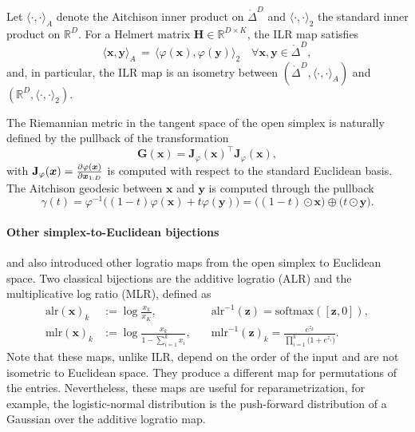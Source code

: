 \begin{theorem}\label{thm:isometry}
Let $\langle\cdot,\cdot\rangle_A$ denote the Aitchison inner product on $\mathring \Delta^{D}$ and $\langle\cdot,\cdot\rangle_2$ the standard inner product on $\mathbb{R}^{D}$. For a Helmert matrix $\mathbf{H} \in\mathbb{R}^{D\times K}$, the ILR map satisfies
\begin{equation*}
    \langle \boldsymbol{x}, \boldsymbol{y} \rangle_A \,=\, \langle \varphi(\boldsymbol{x}), \varphi(\boldsymbol{y}) \rangle_2 \quad \forall \boldsymbol{x},\boldsymbol{y}\in \mathring\Delta^D,
\end{equation*}
and, in particular, the ILR map is an isometry between $(\mathring\Delta^{D},\langle\cdot,\cdot\rangle_A)$ and $(\mathbb{R}^{D},\langle\cdot,\cdot\rangle_2)$. 
\end{theorem}

The Riemannian metric in the tangent space of the open simplex is naturally defined by the pullback of the transformation
\begin{equation*}
    \mathbf{G}(\boldsymbol{x}) = \mathbf{J}_{\varphi}(\boldsymbol{x})^\top\mathbf{J}_{\varphi}(\boldsymbol{x}),
\end{equation*}
with $\mathbf{J}_{\varphi}(\boldsymbol{x}) = \pdv{\varphi(\boldsymbol{x})}{\boldsymbol{x}_{1:D}}$ is computed with respect to the standard Euclidean basis. 
The Aitchison geodesic between $\boldsymbol{x}$ and $\boldsymbol{y}$ is computed through the pullback
\begin{equation*}
    \gamma(t) = \varphi^{-1}\bigl((1-t)\varphi(\boldsymbol{x}) + t\varphi(\boldsymbol{y})\bigr) = 
    \bigl((1-t)\odot \boldsymbol{x}\bigr) \oplus \bigl(t\odot \boldsymbol{y}\bigr).
\end{equation*}

\paragraph{Other simplex-to-Euclidean bijections}
\citet{Aitchison1980} and \citet{Aitchison1982} also introduced other logratio maps from the open simplex to Euclidean space. Two classical bijections are the additive logratio (ALR) and the multiplicative log ratio (MLR), defined as
\begin{align}
    \mathrm{alr}(\boldsymbol{x})_k &:=  \log\tfrac{x_k}{x_{K}}, \quad &\mathrm{alr}^{-1}(\boldsymbol{z}) =  \mathrm{softmax}([\boldsymbol{z},0]),\\
    \mathrm{mlr}(\boldsymbol{x})_k &:=  \log\tfrac{x_k}{1 - \sum_{i=1}^{k} x_{i}}, \quad
    &\mathrm{mlr}^{-1}(\boldsymbol{z})_k =  \frac{e^{z_k}}{\prod_{i=1}^k \big(1+e^{z_i}\big)}.
    \label{eq:alr}
\end{align}
Note that these maps, unlike ILR, depend on the order of the input and are not isometric to Euclidean space. They produce a different map for permutations of the entries.
Nevertheless, these maps are useful for reparametrization, for example, the logistic-normal distribution \citep{Aitchison1980} is the push-forward distribution of a Gaussian over the additive logratio map.

